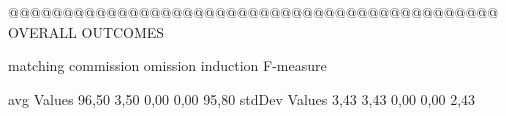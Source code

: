  @@@@@@@@@@@@@@@@@@@@@@@@@@@@@@@@@@@@@@@@@@@@@ OVERALL OUTCOMES

                matching commission   omission  induction   F-measure

avg Values      96,50       3,50       0,00       0,00       95,80        
stdDev Values    3,43       3,43       0,00       0,00        2,43        
